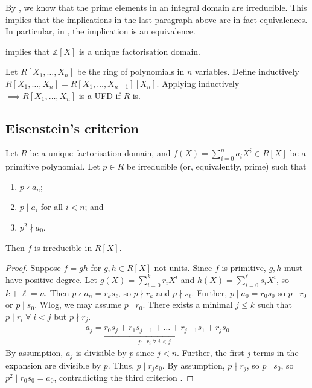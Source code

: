 \begin{remark}
	By , we know that the prime elements in an integral domain are irreducible.
	This implies that the implications in the last paragraph above are in fact equivalences.
	In particular, in , the implication is an equivalence.
\end{remark}

\begin{example}
	 implies that $\mathbb Z[X]$ is a unique factorisation domain.
\end{example}

\begin{example}
	Let $R[X_1, \dots, X_n]$ be the ring of polynomials in $n$ variables.
	Define inductively $R[X_1, \dots, X_n] = R[X_1, \dots, X_{n - 1}][X_n]$.
	Applying  inductively $\implies R[X_1, \dots, X_n]$ is a UFD if $R$ is.
\end{example}

\subsection{Eisenstein's criterion}
\begin{proposition} \label{prp:eisen}
	Let $R$ be a unique factorisation domain, and $f(X) = \sum_{i=0}^n a_i X^i \in R[X]$ be a primitive polynomial.
	Let $p \in R$ be irreducible (or, equivalently, prime) such that
	\begin{enumerate}
		\item $p \nmid a_n$;
		\item $p \mid a_i$ for all $i < n$; and
		\item $p^2 \nmid a_0$.
	\end{enumerate}
	Then $f$ is irreducible in $R[X]$.
\end{proposition}

\begin{proof}
	Suppose $f = gh$ for $g,h \in R[X]$ not units.
	Since $f$ is primitive, $g, h$ must have positive degree.
	Let $g(X) = \sum_{i=0}^k r_i X^i$ and $h(X) = \sum_{i=0}^\ell s_i X^i$, so $k + \ell = n$.
	Then $p \nmid a_n = r_k s_\ell$, so $p \nmid r_k$ and $p \nmid s_\ell$.
	Further, $p \mid a_0 = r_0 s_0$ so $p \mid r_0$ or $p \mid s_0$.
	Wlog, we may assume $p \mid r_0$.
	There exists a minimal $j \leq k$ such that $p \mid r_i \; \forall \; i < j$ but $p \nmid r_j$.
	\begin{align*}
		a_j = \underbracket{r_0 s_j + r_1 s_{j-1} + \dots + r_{j-1} s_1}_{p \mid r_i \; \forall \; i < j} + r_j s_0
	\end{align*}
	By assumption, $a_j$ is divisible by $p$ since $j < n$.
	Further, the first $j$ terms in the expansion are divisible by $p$.
	Thus, $p \mid r_j s_0$.
	By assumption, $p \nmid r_j$, so $p \mid s_0$, so $p^2 \mid r_0 s_0 = a_0$, contradicting the third criterion \Lightning.
\end{proof}

